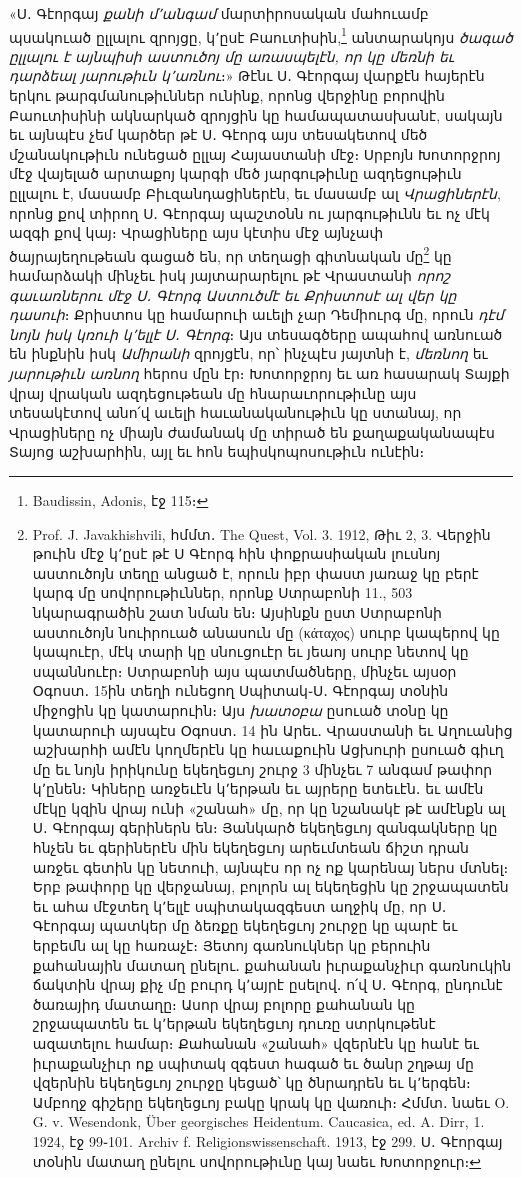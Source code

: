 \documentclass{article}
\begin{document}
{«Ս․ Գէորգայ \emph{քանի մ՚անգամ} մարտիրոսական մահուամբ պսակուած ըլլալու զրոյցը, կ՚ըսէ Բաուտիսին,\footnote{Baudissin, Adonis, էջ 115։} անտարակոյս \emph{ծագած ըլլալու է այնպիսի աստուծոյ մը առասպելէն, որ կը մեռնի եւ դարձեալ յարութիւն կ՚առնու}։» Թէնւ Ս․ Գէորգայ վարքէն հայերէն երկու թարգմանութիւններ ունինք, որոնց վերջինը բորովին Բաուտիսինի ակնարկած զրոյցին կը համապատասխանէ, սակայն եւ այնպէս չեմ կարծեր թէ Ս․ Գէորգ այս տեսակետով մեծ մշանակութիւն ունեցած ըլլայ Հայաստանի մէջ։ Սրբոյն Խոտորջրոյ մէջ վայելած արտաքոյ կարգի մեծ յարգութիւնը ազդեցութիւն ըլլալու է, մասամբ Բիւզանդացիներէն, եւ մասամբ ալ \emph{Վրացիներէն}, որոնց քով տիրող Ս․ Գէորգայ պաշտօնն ու յարգութիւնն եւ ոչ մէկ ազգի քով կայ։ Վրացիները այս կէտիս մէջ այնչափ ծայրայեղութեան գացած են, որ տեղացի գիտնական մը\footnote{Prof. J. Javakhishvili, հմմտ․ The Quest, Vol. 3. 1912, Թիւ 2, 3. Վերջին թուին մէջ կ՚ըսէ թէ Ս Գէորգ հին փոքրասիական լուսնոյ աստուծոյն տեղը անցած է, որուն իբր փաստ յառաջ կը բերէ կարգ մը սովորութիւններ, որոնք Ստրաբոնի 11., 503 նկարագրածին շատ նման են։ Այսինքն ըստ Ստրաբոնի աստուծոյն նուիրուած անասուն մը (κάταχος) սուրբ կապերով կը կապուէր, մէկ տարի կը սնուցուէր եւ յեաոյ սուրբ նետով կը սպաննուէր։ Ստրաբոնի այս պատմածները, մինչեւ այսօր Օգոստ․ 15ին տեղի ունեցող Սպիտակ֊Ս․ Գէորգայ տօնին միջոցին կը կատարուին։ Այս \emph{խատօբա} ըսուած տօնը կը կատարուի այսպէս Օգոստ․ 14 ին Արեւ․ Վրաստանի եւ Աղուանից աշխարհի ամէն կողմերէն կը հաւաքուին Ացխուրի ըսուած գիւղ մը եւ նոյն իրիկունը եկեղեցւոյ շուրջ 3 մինչեւ 7 անգամ թափոր կ՚ընեն։ Կիները առջեւէն կ՚երթան եւ այրերը ետեւէն․ եւ ամէն մէկը կզին վրայ ունի «շանահ» մը, որ կը նշանակէ թէ ամէնքն ալ Ս․ Գէորգայ գերիներն են։ Յանկարծ եկեղեցւոյ զանգակները կը հնչեն եւ գերիներէն մին եկեղեցւոյ արեւմտեան ճիշտ դրան առջեւ գետին կը նետուի, այնպէս որ ոչ ոք կարենայ ներս մտնել։ Երբ թափորը կը վերջանայ, բոլորն ալ եկեղեցին կը շրջապատեն եւ ահա մէջտեղ կ՚ելլէ սպիտակազգեստ աղջիկ մը, որ Ս․ Գէորգայ պատկեր մը ձեռքը եկեղեցւոյ շուրջը կը պարէ եւ երբեմն ալ կը հառաչէ։ Յետոյ գառնուկներ կը բերուին քահանային մատաղ ընելու․ քահանան իւրաքանչիւր գառնուկին ճակտին վրայ քիչ մը բուրդ կ՚այրէ ըսելով․ ո՛վ Ս․ Գէորգ, ընդունէ ծառայիդ մատաղը։ Ասոր վրայ բոլորը քահանան կը շրջապատեն եւ կ՚երթան եկեղեցւոյ դուռը ստրկութենէ ազատելու համար։ Քահանան «շանահ» վզերնէն կը հանէ եւ իւրաքանչիւր ոք սպիտակ զգեստ հագած եւ ծանր շղթայ մը վզերնին եկեղեցւոյ շուրջը կեցած՝ կը ծնրադրեն եւ կ՚երգեն։ Ամբողջ գիշերը եկեղեցւոյ բակը կրակ կը վառուի։ Հմմտ․ նաեւ O. G. v. Wesendonk, Über georgisches Heidentum. Caucasica, ed. A. Dirr, 1. 1924, էջ 99֊101. Archiv f. Religionswissenschaft. 1913, էջ 299. Ս․ Գէորգայ տօնին մատաղ ընելու սովորութիւնը կայ նաեւ Խոտորջուր։} կը համարձակի մինչեւ իսկ յայտարարելու թէ Վրաստանի \emph{որոշ գաւառներու մէջ Ս․ Գէորգ Աստուծմէ եւ Քրիստոսէ ալ վեր կը դասուի}։ Քրիստոս կը համարուի աւելի չար Դեմիուրգ մը, որուն \emph{դէմ նոյն իսկ կռուի կ՚ելլէ Ս․ Գէորգ}։ Այս տեսագծերը ապահով առնուած են ինքնին իսկ \emph{Ամիրանի} զրոյցէն, որ՝ ինչպէս յայտնի է, \emph{մեռնող} եւ \emph{յարութիւն առնող} հերոս մըն էր։ Խոտորջրոյ եւ առ հասարակ Տայքի վրայ վրական ազդեցութեան մը հնարաւորութիւնը այս տեսակէտով անո՛վ աւելի հաւանականութիւն կը ստանայ, որ Վրացիները ոչ միայն ժամանակ մը տիրած են քաղաքականապէս Տայոց աշխարհին, այլ եւ հոն եպիսկոպոսութիւն ունէին։

}
\end{document}

